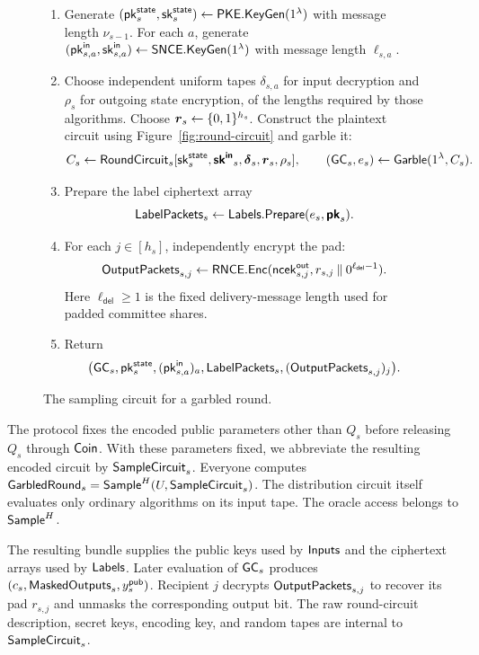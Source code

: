 \begin{figure}[tbp]
{\begin{minipage}{0.95\textwidth}
\begin{description}
    \begin{enumerate}
      \item Generate
        $(\mathsf{pk}^{\mathsf{state}}_s,\mathsf{sk}^{\mathsf{state}}_s)\mathrel{\leftarrow}\mathsf{PKE}.\mathsf{KeyGen}(1^\lambda)$
        with message length $\nu_{s-1}$.
        For each $a$, generate
        $(\mathsf{pk}^{\mathsf{in}}_{s,a},\mathsf{sk}^{\mathsf{in}}_{s,a})\mathrel{\leftarrow}\mathsf{SNCE}.\mathsf{KeyGen}(1^\lambda)$
        with message length $\ell_{s,a}$.
      \item Choose independent uniform tapes $\delta_{s,a}$ for input
        decryption and $\rho_s$ for outgoing state encryption, of the
        lengths required by those algorithms.
        Choose $\boldsymbol r_s\mathrel{\leftarrow}\{0,1\}^{h_s}$.
        Construct the plaintext circuit using Figure~\ref{fig:round-circuit}
        and garble it:
        \[
          C_s\gets\mathsf{RoundCircuit}_s[\mathsf{sk}^{\mathsf{state}}_s,\boldsymbol{\mathsf{sk}^{\mathsf{in}}}_s,
                \boldsymbol\delta_s,\boldsymbol r_s,\rho_s],
          \qquad (\mathsf{GC}_s,e_s)\mathrel{\leftarrow}\mathsf{Garble}(1^\lambda,C_s).
        \]
      \item Prepare the label ciphertext array
        \[
          \mathsf{LabelPackets}_s\mathrel{\leftarrow}\mathsf{Labels}.\mathsf{Prepare}(e_s,\boldsymbol{\mathsf{pk}}_s).
        \]
      \item For each $j\in[h_s]$, independently encrypt the pad:
        \[
          \mathsf{OutputPackets}_{s,j}\mathrel{\leftarrow}
            \mathsf{RNCE}.\mathsf{Enc}(\mathsf{ncek}^{\mathsf{out}}_{s,j},
                 r_{s,j}\mathbin\|0^{\ell_{\mathsf{del}}-1}).
        \]
        Here $\ell_{\mathsf{del}}\geq1$ is the fixed delivery-message
        length used for padded committee shares.
      \item Return
        \[
          \bigl(\mathsf{GC}_s,\mathsf{pk}^{\mathsf{state}}_s,(\mathsf{pk}^{\mathsf{in}}_{s,a})_a,
                 \mathsf{LabelPackets}_s,(\mathsf{OutputPackets}_{s,j})_j\bigr).
        \]
    \end{enumerate}
\end{description}
\end{minipage}}
\caption{The sampling circuit for a garbled round.}
\label{fig:distribution-circuit}
\end{figure}

The protocol fixes the encoded public parameters other than $Q_s$ before
releasing $Q_s$ through $\mathsf{Coin}$.  With these parameters fixed, we abbreviate
the resulting encoded circuit by $\mathsf{SampleCircuit}_s$.  Everyone computes
$\mathsf{GarbledRound}_s=\mathsf{Sample}^H(U,\mathsf{SampleCircuit}_s)$.
The distribution circuit itself evaluates only ordinary algorithms
on its input tape.  The oracle access belongs to $\mathsf{Sample}^H$.

The resulting bundle supplies the public keys used by $\mathsf{Inputs}$ and
the ciphertext arrays used by $\mathsf{Labels}$.  Later evaluation of
$\mathsf{GC}_s$ produces $(c_s,\mathsf{MaskedOutputs}_s,y^{\mathsf{pub}}_s)$.
Recipient $j$ decrypts $\mathsf{OutputPackets}_{s,j}$ to recover its pad
$r_{s,j}$ and unmasks the corresponding output bit.
The raw round-circuit description, secret keys, encoding key, and
random tapes are internal to $\mathsf{SampleCircuit}_s$.

